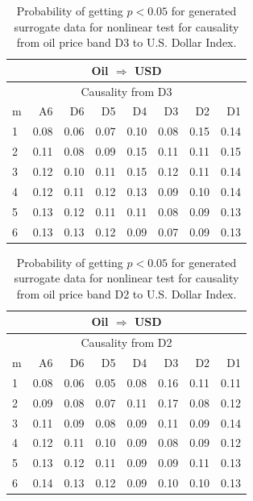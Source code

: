 %
%
\begin{table}[H]
\begin{center}
\begin{tabular}{l|r r r r r r r}
\hline\hline
\multicolumn{8}{c}{Oil $\Rightarrow$ USD}\\
\hline
\multicolumn{8}{c}{Causality from D3}\\
\hline\hline
m & A6 & D6 & D5 & D4 & D3 & D2 & D1 \\
\hline
1 & 0.08 & 0.06 & 0.07 & 0.10 & 0.08 & 0.15 & 0.14 \\
2 & 0.11 & 0.08 & 0.09 & \cellcolor{mygrey}0.15 & 0.11 & 0.11 & 0.15 \\
3 & 0.12 & 0.10 & 0.11 & \cellcolor{mygrey}0.15 & 0.12 & 0.11 & 0.14 \\
4 & 0.12 & 0.11 & 0.12 & 0.13 & 0.09 & 0.10 & 0.14 \\
5 & 0.13 & 0.12 & 0.11 & 0.11 & 0.08 & 0.09 & 0.13 \\
6 & 0.13 & 0.13 & 0.12 & 0.09 & 0.07 & 0.09 & 0.13 \\
\hline\hline
\end{tabular}
\caption{Probability of getting $p < 0.05$ for generated surrogate data for nonlinear test for causality from oil price band D3 to U.S. Dollar Index.}
\end{center}
\end{table}

%
%
\begin{table}[H]
\begin{center}
\begin{tabular}{l|r r r r r r r}
\hline\hline
\multicolumn{8}{c}{Oil $\Rightarrow$ USD}\\
\hline
\multicolumn{8}{c}{Causality from D2}\\
\hline\hline
m & A6 & D6 & D5 & D4 & D3 & D2 & D1 \\
\hline
1 & 0.08 & 0.06 & 0.05 & 0.08 & 0.16 & 0.11 & 0.11 \\
2 & 0.09 & 0.08 & 0.07 & 0.11 & 0.17 & 0.08 & 0.12 \\
3 & 0.11 & 0.09 & 0.08 & 0.09 & 0.11 & 0.09 & 0.14 \\
4 & 0.12 & 0.11 & 0.10 & 0.09 & 0.08 & 0.09 & 0.12 \\
5 & 0.13 & 0.12 & 0.11 & 0.09 & 0.09 & 0.11 & 0.13 \\
6 & 0.14 & 0.13 & 0.12 & 0.09 & 0.10 & 0.10 & 0.13 \\
\hline\hline
\end{tabular}
\caption{Probability of getting $p < 0.05$ for generated surrogate data for nonlinear test for causality from oil price band D2 to U.S. Dollar Index.}
\end{center}
\end{table}

